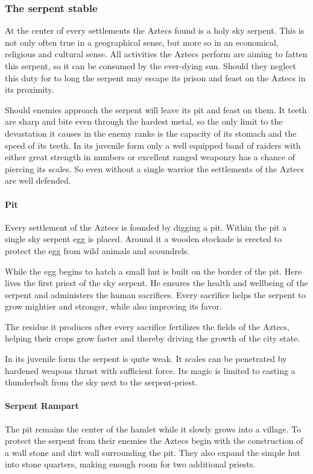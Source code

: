 \documentclass[a4paper]{book}
\begin{document}
		\subsubsection{The serpent stable}
			At the center of every settlements the \gls{Aztecs} found is a holy sky serpent.
			This is not only often true in a geographical sense,
			but more so in an economical, religious and cultural sense.
			All activities the \gls{Aztecs} perform are aiming to fatten this serpent,
			so it can be consumed by the ever-dying sun.
			Should they neglect this duty for to long the serpent may escape its prison
			and feast on the \gls{Aztecs} in its proximity.

			Should enemies approach the serpent will leave its pit and feast on them.
			It teeth are sharp and bite even through the hardest metal,
			so the only limit to the devastation it causes in the enemy ranks
			is the capacity of its stomach and the speed of its teeth.
			In its juvenile form only a well equipped band of raiders with either great strength
			in numbers or excellent ranged weaponry has a chance of piercing its scales.
			So even without a single warrior the settlements of the \gls{Aztecs} are well defended.

			\paragraph{Pit}
				Every settlement of the \gls{Aztecs} is founded by digging a pit.
				Within the pit a single sky serpent egg is placed.
				Around it a wooden stockade is erected to protect the egg from
				wild animals and scoundrels.

				While the egg begins to hatch a small hut is built on the border of the pit.
				Here lives the first priest of the sky serpent.
				He ensures the health and wellbeing of the serpent and administers the human sacrifices.
				Every sacrifice helps the serpent to grow mightier and stronger,
				while also improving its favor.

				The residue it produces after every sacrifice fertilizes the fields of the \gls{Aztecs},
				helping their crops grow faster and thereby driving the growth of the city state.

				In its juvenile form the serpent is quite weak.
				It scales can be penetrated by hardened weapons thrust with sufficient force.
				Its magic is limited to casting a thunderbolt from the sky next
				to the serpent-priest.

			\paragraph{Serpent Rampart}
				The pit remains the center of the hamlet while it slowly grows into a village.
				To protect the serpent from their enemies the \gls{Aztecs}
				begin with the construction of a wall stone and dirt wall surrounding the pit.
				They also expand the simple hut into stone quarters, making enough room
				for two additional priests.
\end{document}
